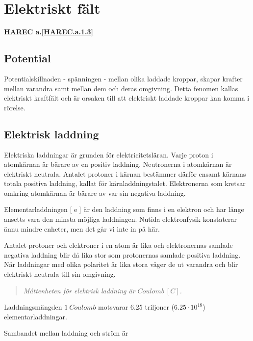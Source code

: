\section{Elektriskt fält}
\textbf{HAREC a.\ref{HAREC.a.1.3}\label{myHAREC.a.1.3}}
\label{elektriskafält}

\subsection{Potential}

Potentialskillnaden - spänningen - mellan olika laddade kroppar, skapar krafter
mellan varandra samt mellan dem och deras omgivning. Detta fenomen kallas
elektriskt kraftfält och är orsaken till att elektriskt laddade kroppar kan
komma i rörelse.

\subsection{Elektrisk laddning}

Elektriska laddningar är grunden för elektricitetsläran. Varje proton i
atomkärnan är bärare av en positiv laddning. Neutronerna i atomkärnan är
elektriskt neutrala. Antalet protoner i kärnan bestämmer därför ensamt kärnans
totala positiva laddning, kallat för kärnladdningstalet. Elektronerna som
kretsar omkring atomkärnan är bärare av var sin negativa laddning.

Elementarladdningen [ e ] är den laddning som finns i en elektron och har länge
ansetts vara den minsta möjliga laddningen. Nutida elektronfysik konstaterar
ännu mindre enheter, men det går vi inte in på här.

Antalet protoner och elektroner i en atom är lika och elektronernas samlade
negativa laddning blir då lika stor som protonernas samlade positiva laddning.
När laddningar med olika polaritet är lika stora väger de ut varandra och blir
elektriskt neutrala till sin omgivning.

\begin{quote}\emph{
Måttenheten för elektrisk laddning är \(Coulomb\ [C]\).
}\end{quote}

Laddningsmängden \(1\ Coulomb\) motsvarar 6.25 triljoner (\(6.25\cdot10^{18}\))
elementarladdningar.

Sambandet mellan laddning och ström är


